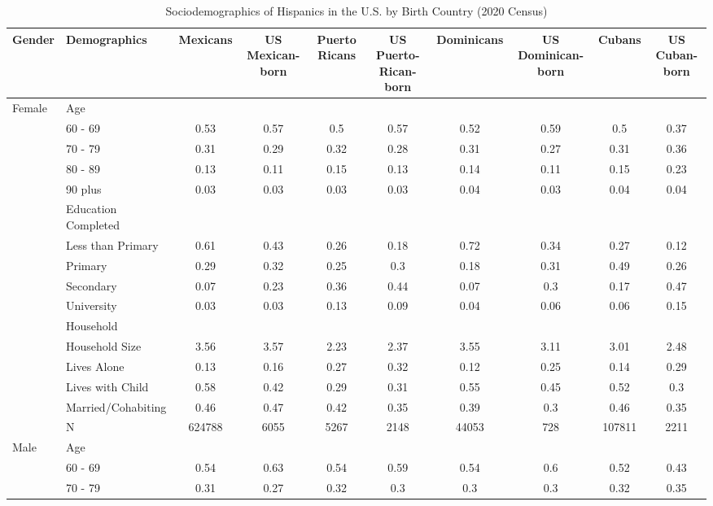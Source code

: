 \begin{table}[ht]
\centering
\caption{Sociodemographics of Hispanics in the U.S. by Birth Country (2020 Census)} 
\begingroup\small
\begin{tabular}{>{\raggedright\arraybackslash}p{3.2cm}l|cccccccc}
  \hline
Gender & Demographics & Mexicans & US Mexican-born & Puerto Ricans & US Puerto-Rican-born & Dominicans & US Dominican-born & Cubans & US Cuban-born \\ 
  \hline
Female & Age &  &  &  &  &  &  &  &  \\ 
   & 60 - 69 & 0.53 & 0.57 & 0.5 & 0.57 & 0.52 & 0.59 & 0.5 & 0.37 \\ 
   & 70 - 79 & 0.31 & 0.29 & 0.32 & 0.28 & 0.31 & 0.27 & 0.31 & 0.36 \\ 
   & 80 - 89 & 0.13 & 0.11 & 0.15 & 0.13 & 0.14 & 0.11 & 0.15 & 0.23 \\ 
   & 90 plus & 0.03 & 0.03 & 0.03 & 0.03 & 0.04 & 0.03 & 0.04 & 0.04 \\ 
   & Education Completed &  &  &  &  &  &  &  &  \\ 
   & Less than Primary & 0.61 & 0.43 & 0.26 & 0.18 & 0.72 & 0.34 & 0.27 & 0.12 \\ 
   & Primary & 0.29 & 0.32 & 0.25 & 0.3 & 0.18 & 0.31 & 0.49 & 0.26 \\ 
   & Secondary & 0.07 & 0.23 & 0.36 & 0.44 & 0.07 & 0.3 & 0.17 & 0.47 \\ 
   & University & 0.03 & 0.03 & 0.13 & 0.09 & 0.04 & 0.06 & 0.06 & 0.15 \\ 
   & Household &  &  &  &  &  &  &  &  \\ 
   & Household Size & 3.56 & 3.57 & 2.23 & 2.37 & 3.55 & 3.11 & 3.01 & 2.48 \\ 
   & Lives Alone & 0.13 & 0.16 & 0.27 & 0.32 & 0.12 & 0.25 & 0.14 & 0.29 \\ 
   & Lives with Child & 0.58 & 0.42 & 0.29 & 0.31 & 0.55 & 0.45 & 0.52 & 0.3 \\ 
   & Married/Cohabiting & 0.46 & 0.47 & 0.42 & 0.35 & 0.39 & 0.3 & 0.46 & 0.35 \\ 
   & N & 624788 & 6055 & 5267 & 2148 & 44053 & 728 & 107811 & 2211 \\ 
  Male & Age &  &  &  &  &  &  &  &  \\ 
   & 60 - 69 & 0.54 & 0.63 & 0.54 & 0.59 & 0.54 & 0.6 & 0.52 & 0.43 \\ 
   & 70 - 79 & 0.31 & 0.27 & 0.32 & 0.3 & 0.3 & 0.3 & 0.32 & 0.35 \\ 

\end{tabular}
\end{table}
